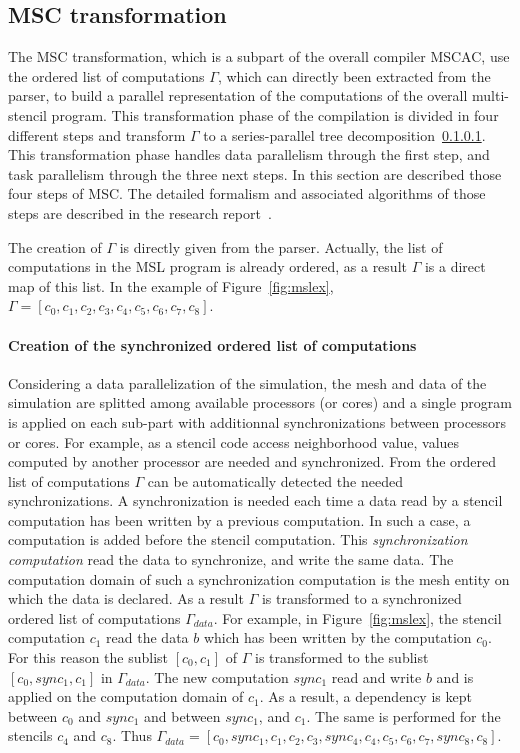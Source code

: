 \subsection{MSC transformation}
The MSC transformation, which is a subpart of the overall compiler MSCAC, use the ordered list of computations $\Gamma$, which can directly been extracted from the parser, to build a parallel representation of the computations of the overall multi-stencil program. This transformation phase of the compilation is divided in four different steps and transform $\Gamma$ to a series-parallel tree decomposition~\ref{}. This transformation phase handles data parallelism through the first step, and task parallelism through the three next steps. In this section are described those four steps of MSC. The detailed formalism and associated algorithms of those steps are described in the research report~\cite{}.

The creation of $\Gamma$ is directly given from the parser. Actually, the list of computations in the MSL program is already ordered, as a result $\Gamma$ is a direct map of this list. In the example of Figure~\ref{fig:mslex}, $\Gamma = [c_0,c_1,c_2,c_3,c_4,c_5,c_6,c_7,c_8]$.

\paragraph{Creation of the synchronized ordered list of computations} Considering a data parallelization of the simulation, the mesh and data of the simulation are splitted among available processors (or cores) and a single program is applied on each sub-part with additionnal synchronizations between processors or cores. For example, as a stencil code access neighborhood value, values computed by another processor are needed and synchronized. 
From the ordered list of computations $\Gamma$ can be automatically detected the needed synchronizations. A synchronization is needed each time a data read by a stencil computation has been written by a previous computation. In such a case, a computation is added before the stencil computation. This \emph{synchronization computation} read the data to synchronize, and write the same data. The computation domain of such a synchronization computation is the mesh entity on which the data is declared. As a result $\Gamma$ is transformed to a synchronized ordered list of computations $\Gamma_{data}$.
For example, in Figure~\ref{fig:mslex}, the stencil computation $c_1$ read the data $b$ which has been written by the computation $c_0$. For this reason the sublist $[c_0,c_1]$ of $\Gamma$ is transformed to the sublist $[c_0,sync_1,c_1]$ in $\Gamma_{data}$. The new computation $sync_1$ read and write $b$ and is applied on the computation domain of $c_1$. As a result, a dependency is kept between $c_0$ and $sync_1$ and between $sync_1$, and $c_1$. The same is performed for the stencils $c_4$ and $c_8$. Thus $\Gamma_{data} = [c_0,sync_1,c_1,c_2,c_3,sync_4,c_4,c_5,c_6,c_7,sync_8,c_8]$.

